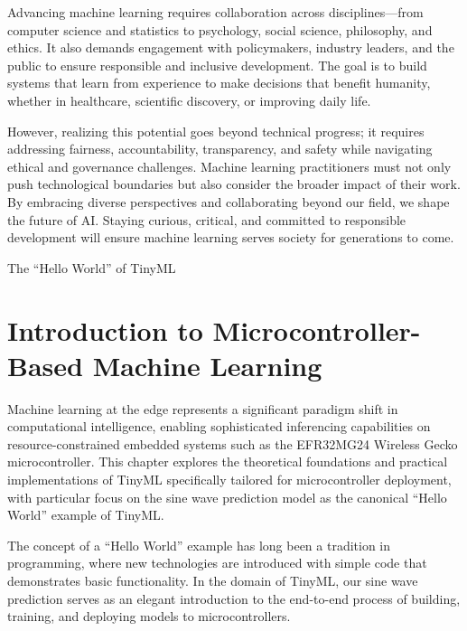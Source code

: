 \documentclass[
  9pt,
  letterpaper,
  abstract,
  titlepage]{scrbook}
\makeatletter
\renewcommand\chapter{\clearpage\global\@topnum\z@
\@afterindentfalse \secdef\@chapter\@schapter}
\newif\if@firstnumbered%
\newif\if@firstunnumbered%
\newcounter{lastRomanPage}
\let\old@chapter\chapter%
\renewcommand{\chapter}{%
  \@ifstar{\unnumbered@chapter}{\numbered@chapter}%
}
\newcommand{\numbered@chapter}[1]{%
  \if@firstnumbered%
    \cleardoublepage%
    \setcounter{lastRomanPage}{\value{page}}%
    \pagenumbering{arabic}%
    \@firstnumberedfalse%
  \else
    \setcounter{page}{\value{page}}%
  \fi
  \old@chapter{#1}%
}
\newcommand{\unnumbered@chapter}[1]{%
  \if@firstunnumbered%
    \clearpage
    \setcounter{lastRomanPage}{\value{page}}%
    \pagenumbering{roman}%
    \@firstunnumberedfalse%
  \fi
  \old@chapter*{#1}%
}
\makeatother
\begin{document}
Advancing machine learning requires collaboration across
disciplines---from computer science and statistics to psychology, social
science, philosophy, and ethics. It also demands engagement with
policymakers, industry leaders, and the public to ensure responsible and
inclusive development. The goal is to build systems that learn from
experience to make decisions that benefit humanity, whether in
healthcare, scientific discovery, or improving daily life.

However, realizing this potential goes beyond technical progress; it
requires addressing fairness, accountability, transparency, and safety
while navigating ethical and governance challenges. Machine learning
practitioners must not only push technological boundaries but also
consider the broader impact of their work. By embracing diverse
perspectives and collaborating beyond our field, we shape the future of
AI. Staying curious, critical, and committed to responsible development
will ensure machine learning serves society for generations to come.

\chapter{The ``Hello World'' of TinyML}\label{the-hello-world-of-tinyml}

\section{Introduction to Microcontroller-Based Machine
Learning}\label{introduction-to-microcontroller-based-machine-learning}

Machine learning at the edge represents a significant paradigm shift in
computational intelligence, enabling sophisticated inferencing
capabilities on resource-constrained embedded systems such as the
EFR32MG24 Wireless Gecko microcontroller. This chapter explores the
theoretical foundations and practical implementations of TinyML
specifically tailored for microcontroller deployment, with particular
focus on the sine wave prediction model as the canonical ``Hello World''
example of TinyML.

The concept of a ``Hello World'' example has long been a tradition in
programming, where new technologies are introduced with simple code that
demonstrates basic functionality. In the domain of TinyML, our sine wave
prediction serves as an elegant introduction to the end-to-end process
of building, training, and deploying models to microcontrollers.
\end{document}
